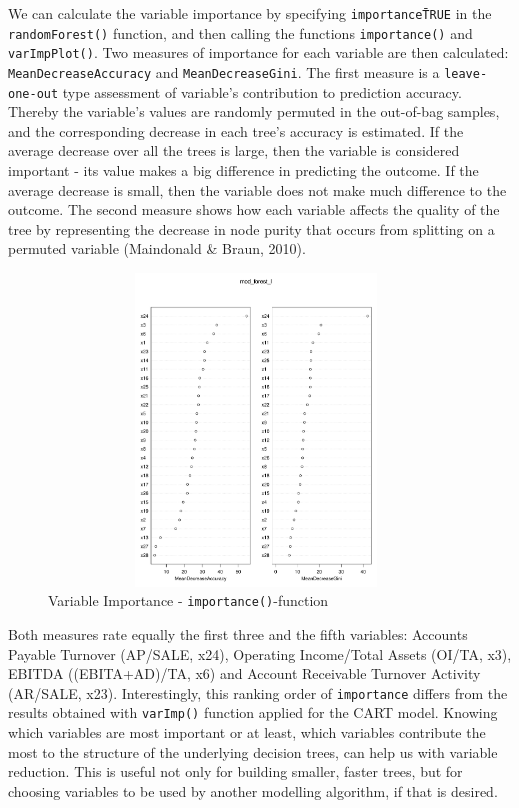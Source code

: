 \documentclass{article}
\begin{document}
We can calculate the variable importance by specifying \texttt{importance\=TRUE} in the \texttt{randomForest()} function, and then calling the functions \texttt{importance()} and \texttt{varImpPlot()}. Two measures of importance for each variable are then calculated: \texttt{MeanDecreaseAccuracy} and \texttt{MeanDecreaseGini}. The first measure is a \texttt{leave-one-out} type assessment of variable's contribution to prediction accuracy. Thereby the variable's values are randomly permuted in the out-of-bag samples, and the corresponding decrease in each tree's accuracy is estimated. If the average decrease over all the trees is large, then the variable is considered important - its value makes a big difference in predicting the outcome. If the average decrease is small, then the variable does not make much difference to the outcome. The second measure shows how each variable affects the quality of the tree by representing the decrease in node purity that occurs from splitting on a permuted variable (Maindonald \& Braun, 2010). 

\begin{figure}[H]
\begin{center}
\caption{Variable Importance - \texttt{importance()}-function}
\includegraphics[scale=1, height=8.3cm, width=11cm]{../Random_Forest/Rplot.pdf}
\end{center}
\end{figure}

Both measures rate equally the first three and the fifth variables: Accounts Payable Turnover (AP/SALE, x24), Operating Income/Total Assets (OI/TA, x3), EBITDA ((EBITA+AD)/TA, x6) and Account Receivable Turnover Activity (AR/SALE, x23). Interestingly, this ranking order of \texttt{importance} differs from the results obtained with \texttt{varImp()} function applied for the CART model. Knowing which variables are most important or at least, which variables contribute the most to the structure of the underlying decision trees, can help us with variable reduction. This is useful not only for building smaller, faster trees, but for choosing variables to be used by another modelling algorithm, if that is desired.
\end{document}
